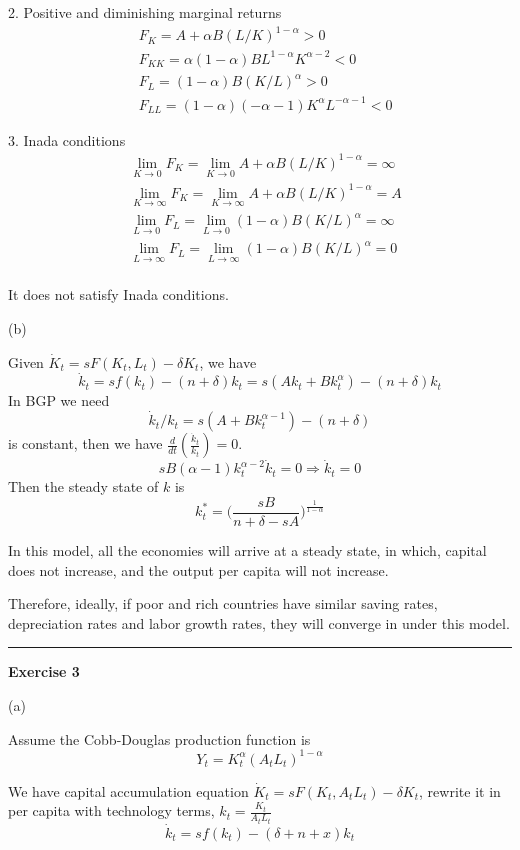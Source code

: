 \documentclass[letterpaper, 11pt]{article}
\newcommand{\1}{\mathds{1}}	%
\theoremstyle{definition}
\begin{document}
2. Positive and diminishing marginal returns \begin{align*}
   & F_K = A + \alpha B (L/K)^{1-\alpha} > 0                     \\
   & F_{KK} = \alpha(1-\alpha)BL^{1-\alpha}K^{\alpha-2} < 0      \\
   & F_L =  (1-\alpha)B (K/L)^{\alpha}  > 0                      \\
   & F_{LL} = (1-\alpha)(-\alpha-1)K^{\alpha}L^{-\alpha - 1} < 0
\end{align*}

3. Inada conditions \begin{align*}
   & \lim_{K \to 0}F_K = \lim_{K \to 0} A + \alpha B (L/K)^{1-\alpha} = \infty       \\
   & \lim_{K \to \infty} F_K = \lim_{K \to \infty} A + \alpha B (L/K)^{1-\alpha} = A \\
   & \lim_{L \to 0}F_L = \lim_{L \to 0}  (1-\alpha)B (K/L)^{\alpha} = \infty         \\
   & \lim_{L \to \infty} F_L = \lim_{L \to \infty} (1-\alpha)B (K/L)^{\alpha} = 0    \\
\end{align*}

It does not satisfy Inada conditions.

(b)

Given $\dot{K}_t = sF(K_t,L_t) - \delta K_t$, we have \[
  \dot{k}_t = sf(k_t) - (n+\delta)k_t = s(Ak_t + B k_t^\alpha) - (n+\delta)k_t
\]
In BGP we need \[
  \dot{k}_t/k_t = s(A + Bk_t^{\alpha-1}) - (n+\delta)
\] is constant, then we have $\frac{d}{dt}(\frac{\dot{k}_t}{k_t}) = 0$. \[
  sB(\alpha-1)k_t^{\alpha-2}\dot{k}_t = 0 \Longrightarrow \dot{k}_t = 0
\]
Then the steady state of $k$ is \[
  k^*_t = \Big(\frac{sB}{n+\delta-sA}\Big)^{\frac{1}{1-\alpha}}
\]

In this model, all the economies will arrive at a steady state, in which, capital does not increase, and the output per capita will not increase.

Therefore, ideally, if poor and rich countries have similar saving rates, depreciation rates and labor growth rates, they will converge in under this model.

\bigskip
\hrule
\bigskip

\textbf{Exercise 3}

(a)

Assume the Cobb-Douglas production function is \[
  Y_t = K_t^\alpha (A_tL_t)^{1-\alpha}
\]

We have capital accumulation equation $\dot{K}_t = sF(K_t,A_tL_t) - \delta K_t$, rewrite it in per capita with technology terms, $k_t = \frac{K_t}{A_tL_t}$ \[
  \dot{k}_t = s f(k_t) - (\delta + n + x)k_t
\]
\end{document}
